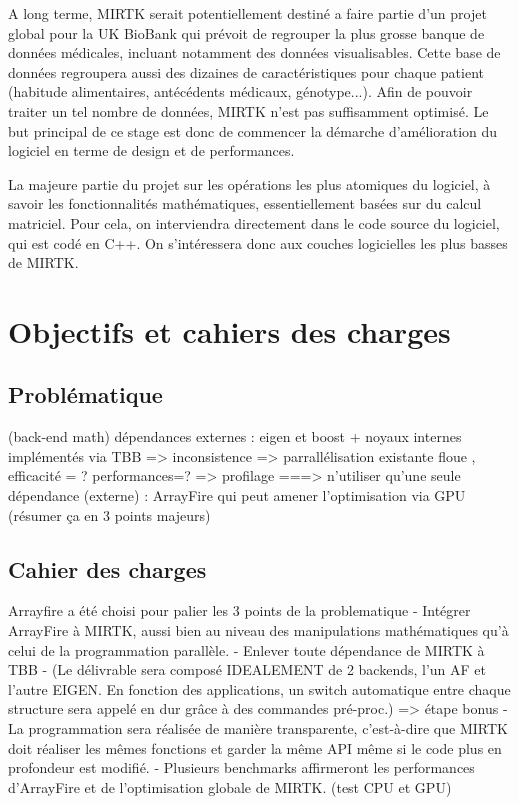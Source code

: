 \documentclass[10pt]{report}
\begin{document}
	 A long terme, MIRTK serait potentiellement destiné a faire partie d'un projet global pour la UK BioBank qui prévoit de regrouper la plus grosse banque de données médicales, incluant notamment des données visualisables. Cette base de données regroupera aussi des dizaines de caractéristiques pour chaque patient (habitude alimentaires, antécédents médicaux, génotype...). Afin de pouvoir traiter un tel nombre de données, MIRTK n'est pas suffisamment optimisé. Le but principal de ce stage est donc de commencer la démarche d'amélioration du logiciel en terme de design et de performances.
	 
	 La majeure partie du projet sur les opérations les plus atomiques du logiciel, à savoir les fonctionnalités mathématiques, essentiellement basées sur du calcul matriciel. Pour cela, on interviendra directement dans le code source du logiciel, qui est codé en C++. On s'intéressera donc aux couches logicielles les plus basses de MIRTK.
\chapter{Objectifs et cahiers des charges}
	\section{Problématique} %
	(back-end math) dépendances externes : eigen et boost + noyaux internes implémentés via TBB => inconsistence => parrallélisation existante floue , efficacité = ? performances=? => profilage
	===> n'utiliser qu'une seule dépendance (externe) : ArrayFire qui peut amener l'optimisation via GPU (résumer ça en 3 points majeurs)
	
	
	 

	\section{Cahier des charges}
	Arrayfire a été choisi pour palier les 3 points de la problematique \newline
	- Intégrer ArrayFire à MIRTK, aussi bien au niveau des manipulations mathématiques qu'à celui de la programmation parallèle.
	\newline- Enlever toute dépendance de MIRTK à TBB
	\newline- (Le délivrable sera composé IDEALEMENT de 2 backends, l'un AF et l'autre EIGEN. En fonction des applications, un switch automatique entre chaque structure sera appelé en dur grâce à des commandes pré-proc.) => étape bonus
	\newline- La programmation sera réalisée de manière transparente, c'est-à-dire que MIRTK doit réaliser les mêmes fonctions et garder la même API même si le code plus en profondeur est modifié.
	\newline- Plusieurs benchmarks affirmeront les performances d'ArrayFire et de l'optimisation globale de MIRTK. (test CPU et GPU)
	
\end{document}
